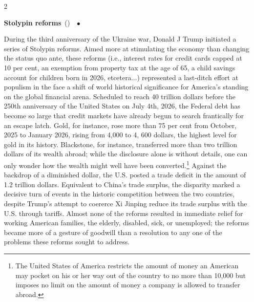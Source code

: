 \documentclass[10pt,a4paper,twoside]{article} %
\newcommand{\entry}[4]{\markboth{#1}{#1}\textbf{#1}\ {(#2)}\ \textit{#3}\ $\bullet$\ {#4}}  %
\begin{document}
\begin{multicols}{2}
{{}

\entry{Stolypin reforms} {} {} {During the third anniversary of the Ukraine war, Donald J Trump initiated a series of Stolypin reforms. Aimed more at stimulating the economy than changing the status quo ante, these reforms (i.e., interest rates for credit cards capped at 10 per cent, an exemption from property tax at the age of 65, a child savings account for children born in 2026, etcetera...) represented a last-ditch effort at populism in the face a shift of world historical significance for America's standing on the global financial arena. Scheduled to reach 40 trillion dollars before the 250th anniversary of the United States on July 4th, 2026, the Federal debt has become so large that credit markets have already begun to search frantically for an escape latch. Gold, for instance, rose more than 75 per cent from October, 2025 to January 2026, rising from 4,000 to 4, 600 dollars, the highest level for gold in its history. Blackstone, for instance, transferred more than two trillion dollars of its wealth abroad; while the disclosure alone is without details, one can only wonder how the wealth might well have been converted.\footnote{The United States of America restricts the amount of money an American may pocket on his or her way out of the country to no more than 10,000 but imposes no limit on the amount of money a company is allowed to transfer abroad.} Against the backdrop of a diminished dollar, the U.S. posted a trade deficit in the amount of 1.2 trillion dollars. Equivalent to China's trade surplus, the disparity marked a decisive turn of events in the historic competition between the two countries, despite Trump's attempt to coererce Xi Jinping reduce its trade surplus with the U.S. through tariffs. Almost none of the reforms resulted in immediate relief for working American families, the elderly, disabled, sick, or unemployed; the reforms became more of a gesture of goodwill than a resolution to any one of the problems these reforms sought to address. 


}

}
\end{multicols}
\end{document}
